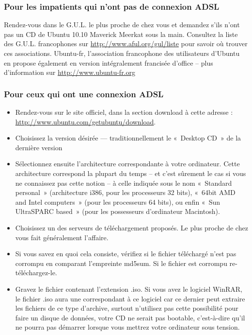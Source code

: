 \subsubsection{Pour les impatients qui n'ont pas de connexion ADSL}
Rendez-vous dans le G.U.L. le plus proche de chez vous et demandez s'ils n'ont pas un CD de Ubuntu 10.10 Maverick Meerkat sous la main. Consultez la liste des G.U.L. francophones sur \url{http://www.aful.org/gul/liste} pour savoir où trouver ces associations. Ubuntu-fr, l'association francophone des utilisateurs d'Ubuntu en propose également en version intégralement francisée d'office -- plus d'information sur \url{http://www.ubuntu-fr.org}
\subsubsection{Pour ceux qui ont une connexion ADSL}
\begin{itemize}
\item Rendez-vous sur le site officiel, dans la section download à cette adresse : \url{http://www.ubuntu.com/getubuntu/download}.
\item Choisissez la version désirée --- traditionnellement le «~Desktop CD~» de la dernière version%
\item Sélectionnez ensuite l'architecture correspondante à votre ordinateur. Cette architecture correspond la plupart du temps -- et c'est sûrement le cas si vous ne connaissez pas cette notion -- à celle indiquée sous le nom «~Standard personal~» (architecture i386, pour les processeurs 32 bits), «~64bit AMD and Intel computers~» (pour les processeurs 64 bits), ou enfin «~Sun UltraSPARC based~» (pour les possesseurs d'ordinateur Macintosh).
\item Choisissez un des serveurs de téléchargement proposés. Le plus proche de chez vous fait généralement l'affaire.
\item Si vous savez en quoi cela consiste, vérifiez si le fichier téléchargé n'est pas corrompu en comparant l'empreinte md5sum. Si le fichier est corrompu re-téléchargez-le.
\item Gravez le fichier contenant l'extension .iso. Si vous avez le logiciel WinRAR, le fichier .iso aura une  correspondant à ce logiciel car ce dernier peut extraire les fichiers de ce type d'archive, surtout n'utilisez pas cette possibilité pour faire un disque de données, votre CD ne serait pas bootable, c'est-à-dire qu'il ne pourra pas démarrer lorsque vous mettrez votre ordinateur sous tension.
\end{itemize}
